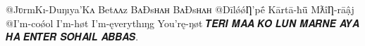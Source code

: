 @JʋrmKı-Duŋıya'Kʌ Betʌʌz BʌÐsʜʌʜ BʌÐsʜʌʜ 
@DīlǿǿȠ'pḗ Kārtā-ħǖ MƛîȠ-rāậj 
@I'm-coǿol I'm-høt I'm-ęverythıŋg You'rę-ŋøt  𝑻𝑬𝑹𝑰 𝑴𝑨𝑨 𝑲𝑶 𝑳𝑼𝑵 𝑴𝑨𝑹𝑵𝑬 𝑨𝒀𝑨 𝑯𝑨 𝑬𝑵𝑻𝑬𝑹 𝑺𝑶𝑯𝑨𝑰𝑳 𝑨𝑩𝑩𝑨𝑺.🤣😂💪🏻
